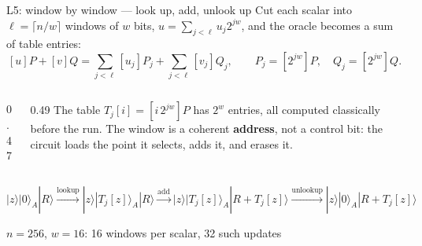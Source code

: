 \documentclass[aspectratio=169,11pt]{beamer}
\begin{document}
\setcounter{framenumber}{93}
\begin{frame}{L5: window by window --- look up, add, unlook up}
  \small Cut each scalar into $\ell=\lceil n/w\rceil$ windows of $w$ bits, $u=\sum_{j<\ell}u_j2^{jw}$, and the oracle becomes a sum of table entries:
  \[ [u]P+[v]Q=\sum_{j<\ell}[u_j]P_j+\sum_{j<\ell}[v_j]Q_j,\qquad P_j=[2^{jw}]P,\quad Q_j=[2^{jw}]Q . \]
  \begin{columns}[c]
    \begin{column}{0.47\textwidth}
      \centering
    \end{column}
    \begin{column}{0.49\textwidth}
      \small The table $T_j[i]=[i\,2^{jw}]P$ has $2^w$ entries, all computed classically before the run. The window is a coherent \textbf{address}, not a control bit: the circuit loads the point it selects, adds it, and erases it.
    \end{column}
  \end{columns}
  \vskip2mm
  \centering\footnotesize
  $|z\rangle|0\rangle_A|R\rangle\xrightarrow{\text{lookup}}|z\rangle|T_j[z]\rangle_A|R\rangle\xrightarrow{\text{add}}|z\rangle|T_j[z]\rangle_A|R+T_j[z]\rangle\xrightarrow{\text{unlookup}}|z\rangle|0\rangle_A|R+T_j[z]\rangle$\par
  \vskip1mm
  {\scriptsize $n=256$, $w=16$: 16 windows per scalar, 32 such updates}
\end{frame}
\end{document}
